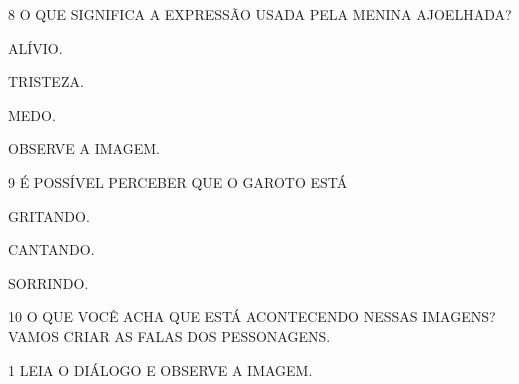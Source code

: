 \num{8} O QUE SIGNIFICA A EXPRESSÃO USADA PELA MENINA AJOELHADA?

\begin{boxlist}
\boxitem[{\rosa{X}}] ALÍVIO.

\boxitem[] TRISTEZA.

\boxitem[] MEDO.
\end{boxlist}

OBSERVE A IMAGEM.


\num{9} É POSSÍVEL PERCEBER QUE O GAROTO ESTÁ

\begin{boxlist}
\boxitem[{\rosa{X}}] GRITANDO. 

\boxitem[] CANTANDO.

\boxitem[] SORRINDO.
\end{boxlist}

\num{10} O QUE VOCÊ ACHA QUE ESTÁ ACONTECENDO NESSAS IMAGENS? VAMOS CRIAR AS FALAS DOS PESSONAGENS.





\num{1} LEIA O DIÁLOGO E OBSERVE A IMAGEM.



